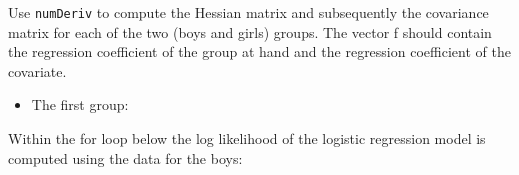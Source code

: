 \documentclass[
]{book}
\newenvironment{Shaded}{\begin{snugshade}}{\end{snugshade}}
\newcommand{\CommentTok}[1]{\textcolor[rgb]{0.56,0.35,0.01}{\textit{#1}}}
\newcommand{\DecValTok}[1]{\textcolor[rgb]{0.00,0.00,0.81}{#1}}
\newcommand{\FunctionTok}[1]{\textcolor[rgb]{0.00,0.00,0.00}{#1}}
\newcommand{\NormalTok}[1]{#1}
\newcommand{\OtherTok}[1]{\textcolor[rgb]{0.56,0.35,0.01}{#1}}
\newcommand{\SpecialCharTok}[1]{\textcolor[rgb]{0.00,0.00,0.00}{#1}}
\providecommand{\tightlist}{%
  \setlength{\itemsep}{0pt}\setlength{\parskip}{0pt}}
\begin{document}
Use \texttt{numDeriv} to compute the Hessian matrix and subsequently the covariance matrix for each of the two (boys and girls) groups. The vector f should contain the regression coefficient of the group at hand and the regression coefficient of the covariate.

\begin{itemize}
\tightlist
\item
  The first group:
\end{itemize}

\begin{Shaded}
\end{Shaded}

Within the for loop below the log likelihood of the logistic regression model is computed using the data for the boys:
\end{document}
